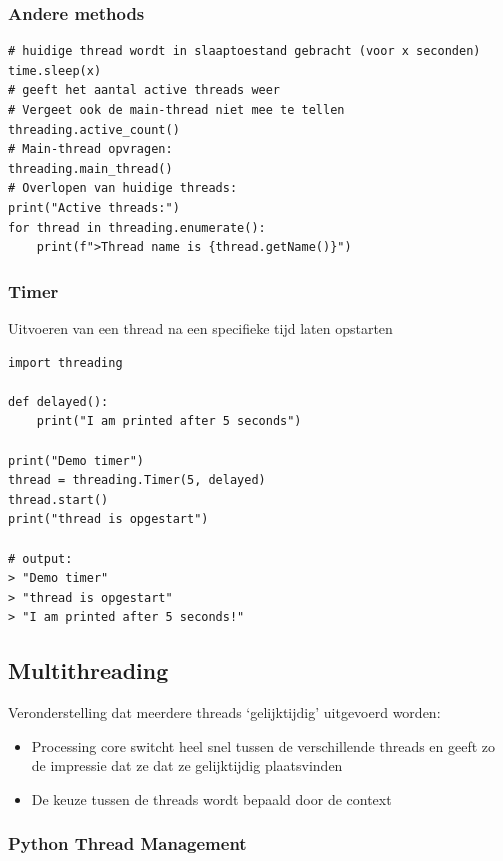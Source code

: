 \documentclass{article}
\begin{document}
\subsubsection{Andere methods}

\begin{verbatim}
# huidige thread wordt in slaaptoestand gebracht (voor x seconden)
time.sleep(x)
# geeft het aantal active threads weer
# Vergeet ook de main-thread niet mee te tellen
threading.active_count() 
# Main-thread opvragen: 
threading.main_thread()
# Overlopen van huidige threads:
print("Active threads:")
for thread in threading.enumerate():
    print(f">Thread name is {thread.getName()}")
\end{verbatim}

\subsubsection{Timer}

Uitvoeren van een thread na een specifieke tijd laten opstarten

\begin{verbatim}
import threading

def delayed():
    print("I am printed after 5 seconds")

print("Demo timer")
thread = threading.Timer(5, delayed)
thread.start()
print("thread is opgestart")

# output:
> "Demo timer"
> "thread is opgestart"
> "I am printed after 5 seconds!"
\end{verbatim}

\subsection{Multithreading}

Veronderstelling dat meerdere threads `gelijktijdig' uitgevoerd worden:

\begin{itemize}
    \item Processing core switcht heel snel tussen de verschillende threads en geeft zo de impressie dat ze dat ze gelijktijdig plaatsvinden
    \item De keuze tussen de threads wordt bepaald door de context
\end{itemize}

\subsubsection{Python Thread Management}
\end{document}
